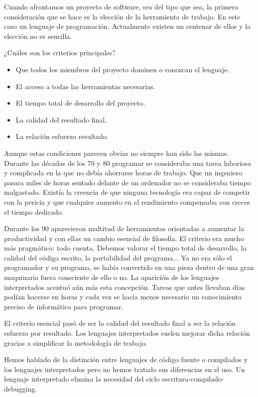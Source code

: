 Cuando afrontamos un proyecto de software, sea del tipo que sea, la
primera consideración que se hace es la elección de la herramienta de
trabajo. En este caso un lenguaje de programación. Actualmente existen
un centenar de ellos y la elección no es sencilla.

¿Cuáles son los criterios principales?

\begin{itemize}
\item Que todos los miembros del proyecto dominen o conozcan el
  lenguaje.
\item El acceso a todas las herramientas necesarias.
\item El tiempo total de desarrollo del proyecto.
\item La calidad del resultado final.
\item La relación esfuerzo resultado.
\end{itemize}

Aunque estas condiciones parecen obvias no siempre han sido las
mismas.  Durante las décadas de los 70 y 80 programar se consideraba
una tarea laboriosa y complicada en la que no debía ahorrarse horas de
trabajo.  Que un ingeniero pasara miles de horas sentado delante de un
ordenador no se consideraba tiempo malgastado.  Existía la creencia de
que ninguna tecnología era capaz de competir con la pericia y que
cualquier aumento en el rendimiento compensaba con creces el tiempo
dedicado.

Durante los 90 aparecieron multitud de herramientas orientadas a
aumentar la productividad y con ellas un cambio esencial de filosofía.
El criterio era mucho más pragmático: todo cuenta.  Debemos valorar el
tiempo total de desarrollo, la calidad del código escrito, la
portabilidad del programa...  Ya no era sólo el programador y su
programa, se había convertido en una pieza dentro de una gran
maquinaria fuera consciente de ello o no.  La aparición de los
lenguajes interpretados acentuó aún más esta concepción.  Tareas que
antes llevaban días podían hacerse en horas y cada vez se hacía menos
necesario un conocimiento preciso de informática para programar.

El criterio esencial pasó de ser la calidad del resultado final a ser
la relación esfuerzo por resultado.  Los lenguajes interpretados suelen
mejorar dicha relación gracias a simplificar la metodología de
trabajo.

Hemos hablado de la distinción entre lenguajes de código fuente o
compilados y los lenguajes interpretados pero no hemos tratado sus
diferencias en el uso. Un lenguaje interpretado elimina la
necesidad del ciclo escritura-compilado-debugging.


